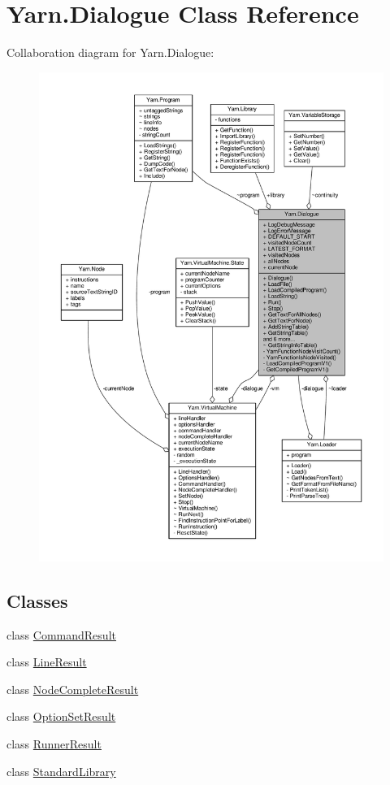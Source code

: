 \hypertarget{a00072}{\section{Yarn.\-Dialogue Class Reference}
\label{a00072}
}


Collaboration diagram for Yarn.\-Dialogue\-:
\nopagebreak
\begin{figure}[H]
\begin{center}
\leavevmode
\includegraphics[width=350pt]{d4/d9c/a00543}
\end{center}
\end{figure}
\subsection*{Classes}
\begin{DoxyCompactItemize}
\item 
class \hyperlink{a00032}{Command\-Result}
\item 
class \hyperlink{a00106}{Line\-Result}
\item 
class \hyperlink{a00113}{Node\-Complete\-Result}
\item 
class \hyperlink{a00119}{Option\-Set\-Result}
\item 
class \hyperlink{a00132}{Runner\-Result}
\item 
class \hyperlink{a00140}{Standard\-Library}
\end{DoxyCompactItemize}
